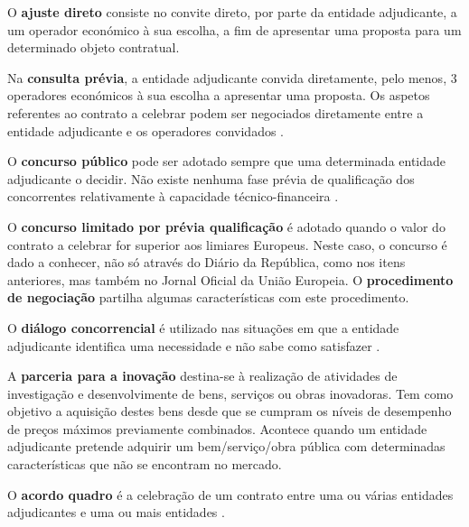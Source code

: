 \begin{my_enumerate}
	
	\item O \textbf{ajuste direto} consiste no convite direto, por parte da entidade adjudicante, a um operador económico à sua escolha, a fim de apresentar uma proposta para um determinado objeto contratual\cite{ajustedir}.
	
	\item Na \textbf{consulta prévia}, a entidade adjudicante convida diretamente, pelo menos, 3 operadores económicos à sua escolha a apresentar uma proposta. Os aspetos referentes ao contrato a celebrar podem ser negociados diretamente entre a entidade adjudicante e os operadores convidados \cite{consultaprev}. 
	
	\item O \textbf{concurso público} pode ser adotado sempre que uma determinada entidade adjudicante o decidir. Não existe nenhuma fase prévia de qualificação dos concorrentes relativamente à capacidade técnico-financeira \cite{concursopub}. 
	
	\item O \textbf{concurso limitado por prévia qualificação} é adotado quando o valor do contrato a celebrar for superior aos limiares Europeus. Neste caso, o concurso é dado a conhecer, não só através do Diário da República, como nos itens anteriores, mas também no Jornal Oficial da União Europeia\cite{previaqual}. O \textbf{procedimento de negociação} partilha algumas características com este procedimento. 
	
	\item O \textbf{diálogo concorrencial} é utilizado nas situações em que a entidade adjudicante identifica uma necessidade e não sabe como satisfazer \cite{dialogoconc}. 
	
	\item A \textbf{parceria para a inovação} destina-se à realização de atividades de investigação e desenvolvimente de bens, serviços ou obras inovadoras. Tem como objetivo a aquisição destes bens desde que se cumpram os níveis de desempenho de preços máximos
	previamente combinados. Acontece quando um entidade adjudicante pretende adquirir um bem/serviço/obra
	pública com determinadas características que não se encontram no mercado. 
	
	\item O \textbf{acordo quadro} é a celebração de um contrato entre uma ou várias entidades adjudicantes e uma ou mais entidades \cite{acordoquadro}. 
	
	
	
\end{my_enumerate}

